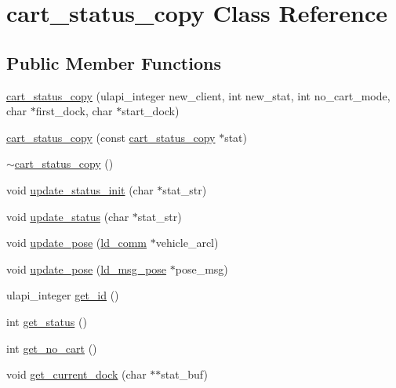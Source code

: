 \hypertarget{classcart__status__copy}{}\section{cart\+\_\+status\+\_\+copy Class Reference}
\label{classcart__status__copy}
\subsection*{Public Member Functions}
\begin{DoxyCompactItemize}
\item 
\hyperlink{classcart__status__copy_a20571920a3d289d2323ad3e34b2b5384}{cart\+\_\+status\+\_\+copy} (ulapi\+\_\+integer new\+\_\+client, int new\+\_\+stat, int no\+\_\+cart\+\_\+mode, char $\ast$first\+\_\+dock, char $\ast$start\+\_\+dock)
\item 
\hyperlink{classcart__status__copy_a90c5926fe489811f9ab083de0ff5b058}{cart\+\_\+status\+\_\+copy} (const \hyperlink{classcart__status__copy}{cart\+\_\+status\+\_\+copy} $\ast$stat)
\item 
\hyperlink{classcart__status__copy_a82d5b501ba06b8058da51a94672b3ea3}{$\sim$cart\+\_\+status\+\_\+copy} ()
\item 
void \hyperlink{classcart__status__copy_ac0af1c110916a2fdd7ab7198bdca183a}{update\+\_\+status\+\_\+init} (char $\ast$stat\+\_\+str)
\item 
void \hyperlink{classcart__status__copy_ace79b133b98000c72617917b1f434df8}{update\+\_\+status} (char $\ast$stat\+\_\+str)
\item 
void \hyperlink{classcart__status__copy_abc65e581df602a25f173e06ae5d453bf}{update\+\_\+pose} (\hyperlink{classld__comm}{ld\+\_\+comm} $\ast$vehicle\+\_\+arcl)
\item 
void \hyperlink{classcart__status__copy_ac688410b9b4a237d6ce6379e10f3c8bb}{update\+\_\+pose} (\hyperlink{structld__msg__pose}{ld\+\_\+msg\+\_\+pose} $\ast$pose\+\_\+msg)
\item 
ulapi\+\_\+integer \hyperlink{classcart__status__copy_a30bf6eef16e96b282b4e79ca9ccb36dd}{get\+\_\+id} ()
\item 
int \hyperlink{classcart__status__copy_a482b6c7e3bcd3102028c59dacb70ad00}{get\+\_\+status} ()
\item 
int \hyperlink{classcart__status__copy_ae9b79c2205e6d9e2c64ac206cf551366}{get\+\_\+no\+\_\+cart} ()
\item 
void \hyperlink{classcart__status__copy_abcd7994b919a1a5191df8d29fceacbb3}{get\+\_\+current\+\_\+dock} (char $\ast$$\ast$stat\+\_\+buf)
$$
\end{DoxyCompactItemize}
